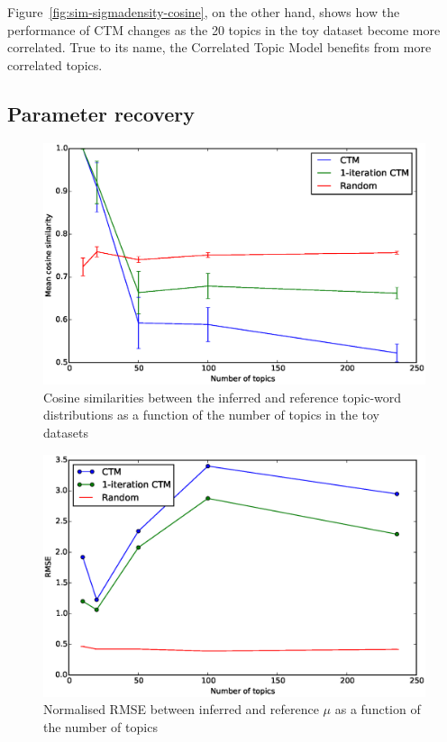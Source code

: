 \documentclass[12pt,a4paper,twoside,openright]{report}
\begin{document}
Figure~\ref{fig:sim-sigmadensity-cosine}, on the other hand, shows how the performance of CTM changes as the 20 topics in the toy dataset become more correlated. True to its name, the Correlated Topic Model benefits from more correlated topics.

\subsection{Parameter recovery}

\begin{figure}[!htb]
\includegraphics[width=\textwidth]{sim-beta-cosine.eps}
\caption{Cosine similarities between the inferred and reference topic-word distributions as a function of the number of topics in the toy datasets}
\label{fig:sim-beta-cosine}
\end{figure}

\begin{figure}[!htb]
\includegraphics[width=\textwidth]{sim-mu-rmse.eps}
\caption{Normalised RMSE between inferred and reference $\mu$ as a function of the number of topics}
\label{fig:sim-mu-rmse}
\end{figure}
\end{document}
